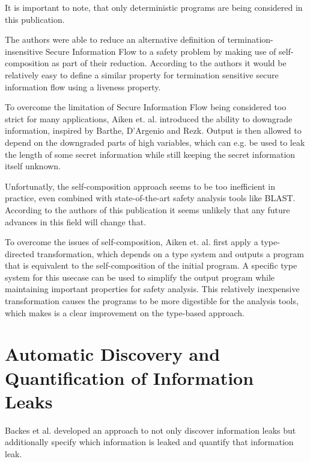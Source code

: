 \documentclass[a4paper,UKenglish]{lipics-v2018}
\begin{document}
It is important to note, that only deterministic programs are being considered in this publication. 

The authors were able to reduce an alternative definition of termination-insensitive Secure Information Flow to a safety problem by making use of self-composition as part of their reduction. According to the authors it would be relatively easy to define a similar property for termination sensitive secure information flow using a liveness property.\cite{secure_information_flow_safety}

To overcome the limitation of Secure Information Flow being considered too strict for many applications, Aiken et. al. introduced the ability to downgrade information, inspired by Barthe, D'Argenio and Rezk. Output is then allowed to depend on the downgraded parts of high variables, which can e.g. be used to leak the length of some secret information while still keeping the secret information itself unknown.\cite{secure_information_flow_safety}

Unfortunatly, the self-composition approach seems to be too inefficient in practice, even combined with state-of-the-art safety analysis tools like BLAST. According to the authors of this publication it seems unlikely that any future advances in this field will change that.\cite{secure_information_flow_safety}

To overcome the issues of self-composition, Aiken et. al. first apply a type-directed transformation, which depends on a type system and outputs a program that is equivalent to the self-composition of the initial program. A specific type system for this usecase can be used to simplify the output program while maintaining important properties for safety analysis. This relatively inexpensive transformation causes the programs to be more digestible for the analysis tools, which makes is a clear  improvement on the type-based approach.\cite{secure_information_flow_safety}



\newpage
\section{Automatic Discovery and Quantification of Information Leaks}

Backes et al. developed an approach to not only discover information leaks but additionally specify which information is leaked and quantify that information leak.\cite{automatic_discovery_and_quantification}
\end{document}
